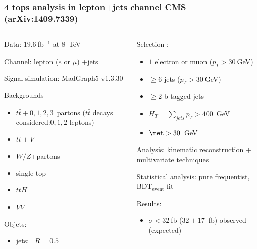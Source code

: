 \begin{frame}
\frametitle{4 tops analysis in lepton+jets channel CMS (arXiv:1409.7339)}
\begin{columns}
\begin{column}{0.5\textwidth}
\begin{maliste}
\item Data: $19.6~$fb$^{-1}$ at $8$~TeV
\item Channel: lepton ($e$ or $\mu$) +jets
\item Signal simulation: MadGraph5 v1.3.30
\item Backgrounds
\begin{itemize}
\item $t\bar{t}+0,1,2,3$~partons ($t\bar{t}$ decays considered:$0,1,2$ leptons)
\item $t\bar{t}+V$
\item $W/Z$+partons
\item single-top
\item $t\bar{t}H$
\item $VV$
\end{itemize}
\item Objets:
\begin{itemize}
\item jets: \antikt~$R=0.5$
\end{itemize}
\end{maliste}
\end{column}
\begin{column}{0.5\textwidth}
\begin{maliste}
\item Selection :
\begin{itemize}
\item $1$ electron or muon ($p_T>30~$GeV)
\item $\geq 6$ jets ($p_T>30~$GeV)
\item $\geq 2$ b-tagged jets
\item $H_T=\sum\limits_{jets}p_T >400$~GeV
\item $\met > 30$~GeV
\end{itemize}
\item Analysis: kinematic reconstruction + multivariate techniques
\item Statistical analysis: pure frequentist, BDT$_\text{event}$ fit
\item Results: 
\begin{itemize}
\item $\sigma<32~$fb ($32\pm 17$~fb) observed (expected)
\end{itemize}
\end{maliste}
\end{column}
\end{columns}

\end{frame}


